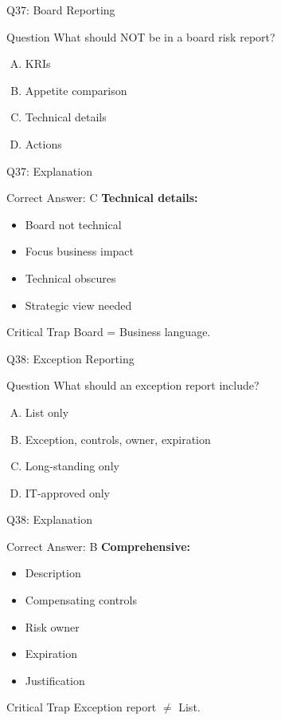 \documentclass{beamer}
\begin{document}
			\begin{frame}{Q37: Board Reporting}
				\begin{block}{Question}
					What should NOT be in a board risk report?
				\end{block}
				\begin{enumerate}[(A)]
					\item KRIs
					\item Appetite comparison
					\item Technical details
					\item Actions
				\end{enumerate}
			\end{frame}
			
			\begin{frame}{Q37: Explanation}
				\begin{block}{Correct Answer: C}
					\textbf{Technical details:}
					\begin{itemize}
						\item Board not technical
						\item Focus business impact
						\item Technical obscures
						\item Strategic view needed
					\end{itemize}
				\end{block}
				\begin{alertblock}{Critical Trap}
					Board = Business language.
				\end{alertblock}
			\end{frame}
			
			\begin{frame}{Q38: Exception Reporting}
				\begin{block}{Question}
					What should an exception report include?
				\end{block}
				\begin{enumerate}[(A)]
					\item List only
					\item Exception, controls, owner, expiration
					\item Long-standing only
					\item IT-approved only
				\end{enumerate}
			\end{frame}
			
			\begin{frame}{Q38: Explanation}
				\begin{block}{Correct Answer: B}
					\textbf{Comprehensive:}
					\begin{itemize}
						\item Description
						\item Compensating controls
						\item Risk owner
						\item Expiration
						\item Justification
					\end{itemize}
				\end{block}
				\begin{alertblock}{Critical Trap}
					Exception report $\neq$ List.
				\end{alertblock}
			\end{frame}
			
\end{document}
